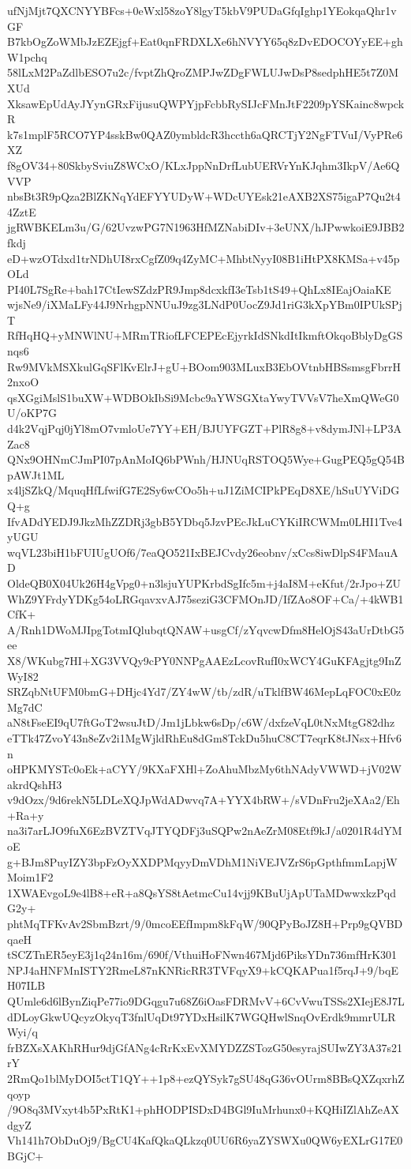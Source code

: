 ufNjMjt7QXCNYYBFcs+0eWxl58zoY8lgyT5kbV9PUDaGfqIghp1YEokqaQhr1vGF
B7kbOgZoWMbJzEZEjgf+Eat0qnFRDXLXe6hNVYY65q8zDvEDOCOYyEE+ghW1pchq
58lLxM2PaZdlbESO7u2c/fvptZhQroZMPJwZDgFWLUJwDsP8sedphHE5t7Z0MXUd
XksawEpUdAyJYynGRxFijusuQWPYjpFcbbRySIJcFMnJtF2209pYSKainc8wpckR
k7s1mplF5RCO7YP4sskBw0QAZ0ymbldcR3hccth6aQRCTjY2NgFTVuI/VyPRe6XZ
f8gOV34+80SkbySviuZ8WCxO/KLxJppNnDrfLubUERVrYnKJqhm3IkpV/Ae6QVVP
nbsBt3R9pQza2BlZKNqYdEFYYUDyW+WDcUYEsk21eAXB2XS75igaP7Qu2t44ZztE
jgRWBKELm3u/G/62UvzwPG7N1963HfMZNabiDIv+3eUNX/hJPwwkoiE9JBB2fkdj
eD+wzOTdxd1trNDhUI8rxCgfZ09q4ZyMC+MhbtNyyI08B1iHtPX8KMSa+v45pOLd
PI40L7SgRe+bah17CtIewSZdzPR9Jmp8dcxkfI3eTsb1tS49+QhLx8IEajOaiaKE
wjsNe9/iXMaLFy44J9NrhgpNNUuJ9zg3LNdP0UocZ9Jd1riG3kXpYBm0IPUkSPjT
RfHqHQ+yMNWlNU+MRmTRiofLFCEPEcEjyrkIdSNkdItIkmftOkqoBblyDgGSnqs6
Rw9MVkMSXkulGqSFlKvElrJ+gU+BOom903MLuxB3EbOVtnbHBSsmsgFbrrH2nxoO
qsXGgiMslS1buXW+WDBOkIbSi9Mcbc9aYWSGXtaYwyTVVsV7heXmQWeG0U/oKP7G
d4k2VqjPqj0jYl8mO7vmloUe7YY+EH/BJUYFGZT+PlR8g8+v8dymJNl+LP3AZac8
QNx9OHNmCJmPI07pAnMoIQ6bPWnh/HJNUqRSTOQ5Wye+GugPEQ5gQ54BpAWJt1ML
x4ljSZkQ/MquqHfLfwifG7E2Sy6wCOo5h+uJ1ZiMCIPkPEqD8XE/hSuUYViDGQ+g
IfvADdYEDJ9JkzMhZZDRj3gbB5YDbq5JzvPEcJkLuCYKiIRCWMm0LHI1Tve4yUGU
wqVL23biH1bFUIUgUOf6/7eaQO521IxBEJCvdy26eobnv/xCcs8iwDlpS4FMauAD
OldeQB0X04Uk26H4gVpg0+n3lsjuYUPKrbdSgIfc5m+j4aI8M+eKfut/2rJpo+ZU
WhZ9YFrdyYDKg54oLRGqavxvAJ75seziG3CFMOnJD/IfZAo8OF+Ca/+4kWB1CfK+
A/Rnh1DWoMJIpgTotmIQlubqtQNAW+usgCf/zYqvcwDfm8HelOjS43aUrDtbG5ee
X8/WKubg7HI+XG3VVQy9cPY0NNPgAAEzLcovRufI0xWCY4GuKFAgjtg9InZWyI82
SRZqbNtUFM0bmG+DHjc4Yd7/ZY4wW/tb/zdR/uTklfBW46MepLqFOC0xE0zMg7dC
aN8tFseEI9qU7ftGoT2wsuJtD/Jm1jLbkw6sDp/c6W/dxfzeVqL0tNxMtgG82dhz
eTTk47ZvoY43n8eZv2i1MgWjldRhEu8dGm8TckDu5huC8CT7eqrK8tJNsx+Hfv6n
oHPKMYSTc0oEk+aCYY/9KXaFXHl+ZoAhuMbzMy6thNAdyVWWD+jV02WakrdQshH3
v9dOzx/9d6rekN5LDLeXQJpWdADwvq7A+YYX4bRW+/sVDnFru2jeXAa2/Eh+Ra+y
na3i7arLJO9fuX6EzBVZTVqJTYQDFj3uSQPw2nAeZrM08Etf9kJ/a0201R4dYMoE
g+BJm8PuyIZY3bpFzOyXXDPMqyyDmVDhM1NiVEJVZrS6pGpthfmmLapjWMoim1F2
1XWAEvgoL9e4lB8+eR+a8QsYS8tAetmcCu14vjj9KBuUjApUTaMDwwxkzPqdG2y+
phtMqTFKvAv2SbmBzrt/9/0mcoEEfImpm8kFqW/90QPyBoJZ8H+Prp9gQVBDqaeH
tSCZTnER5eyE3j1q24n16m/690f/VthuiHoFNwn467Mjd6PiksYDn736mfHrK301
NPJ4aHNFMnISTY2RmeL87nKNRicRR3TVFqyX9+kCQKAPua1f5rqJ+9/bqEH07ILB
QUmle6d6lBynZiqPe77io9DGqgu7u68Z6iOasFDRMvV+6CvVwuTSSs2XIejE8J7L
dDLoyGkwUQcyzOkyqT3fnlUqDt97YDxHsilK7WGQHwlSnqOvErdk9mmrULRWyi/q
frBZXsXAKhRHur9djGfANg4cRrKxEvXMYDZZSTozG50esyrajSUIwZY3A37s21rY
2RmQo1blMyDOI5ctT1QY++1p8+ezQYSyk7gSU48qG36vOUrm8BBsQXZqxrhZqoyp
/9O8q3MVxyt4b5PxRtK1+phHODPISDxD4BGl9IuMrhunx0+KQHiIZlAhZeAXdgyZ
Vh141h7ObDuOj9/BgCU4KafQkaQLkzq0UU6R6yaZYSWXu0QW6yEXLrG17E0BGjC+
